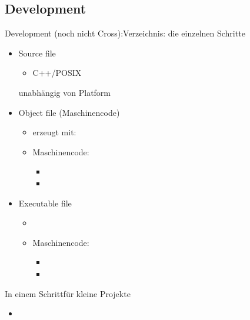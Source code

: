 \subsection{Development}

\begin{frame}{Development (noch nicht Cross):Verzeichnis: }{die einzelnen Schritte}
 \begin{itemize}
  \item Source file 
  \begin{itemize}
   \item C++/POSIX
  \end{itemize}
  unabhängig von Platform
  \item Object file (Maschinencode) 
  \begin{itemize}
   \item erzeugt mit: 
   \item Maschinencode: 
   \begin{itemize}
    \item {} 
    \item {}
   \end{itemize}
  \end{itemize}
  \item Executable file 
  \begin{itemize}
   \item {}
   \item Maschinencode:
   \begin{itemize}
    \item {} 
    \item {}
   \end{itemize}
  \end{itemize}
 \end{itemize}
\end{frame}

\begin{frame}{In einem Schritt}{für kleine Projekte}
 \begin{itemize}
  \item {}
 \end{itemize}
\end{frame}

